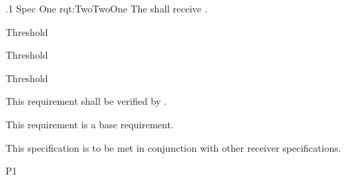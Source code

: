 \ONERQMTV
{\RqtNumberBase.1}
{\ThisSubSegment Spec One}
{rqt:TwoTwoOne}
{The \ThisSys shall receive \TBD.}
{
	\item [Light]  Threshold
	\item [Medium] Threshold
	\item [Heavy]  Threshold
}
{This requirement shall be verified by \TBD.}
{
	\item [N/A] This requirement is a base requirement.
}
{
	\item This specification is to be met in conjunction with other receiver specifications.
}
{P1}

